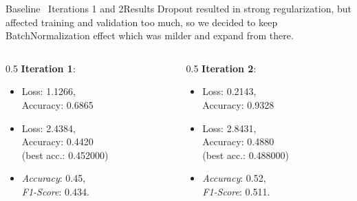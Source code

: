 \begin{frame}{Baseline \textendash\ Iterations 1 and 2}{Results}
  Dropout resulted in strong regularization, but affected training and validation too much,
  so we decided to keep BatchNormalization effect which was milder and expand from there. 
  \vspace{\baselineskip}
  \begin{columns}
    \begin{column}{0.5\linewidth}
      \textbf{Iteration 1}:
      \begin{itemize}
        \item [train] Loss: 1.1266,\\ Accuracy: 0.6865
        \item [val] Loss: 2.4384,\\ Accuracy: 0.4420 \\ (best acc.: 0.452000)
        \item [test] \textit{Accuracy}: 0.45,\\ \textit{F1-Score}: 0.434.
      \end{itemize}
    \end{column}
    \begin{column}{0.5\linewidth}
      \textbf{Iteration 2}:
      \begin{itemize}
        \item [train] Loss: 0.2143,\\ Accuracy: 0.9328
        \item [val] Loss: 2.8431,\\ Accuracy: 0.4880 \\  (best acc.: 0.488000)
        \item [test] \textit{Accuracy}: 0.52,\\ \textit{F1-Score}: 0.511.
      \end{itemize}
    \end{column}
  \end{columns}
  \let\thefootnote\relax{}
\end{frame}

